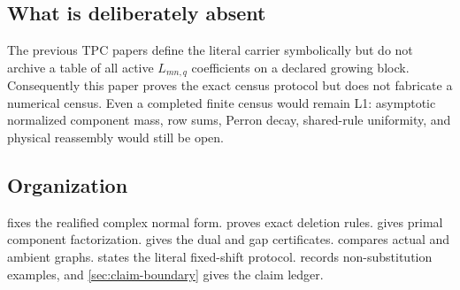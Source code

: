 \subsection{What is deliberately absent}

The previous TPC papers define the literal carrier symbolically but do
not archive a table of all active \(L_{mn,q}\) coefficients on a
declared growing block. Consequently this paper proves the exact census
protocol but does not fabricate a numerical census. Even a completed
finite census would remain L1: asymptotic normalized component mass,
row sums, Perron decay, shared-rule uniformity, and physical reassembly
would still be open.

\subsection{Organization}

 fixes the realified complex normal form.
 proves exact deletion rules.
 gives primal component factorization.
 gives the dual and gap certificates.
 compares actual and ambient graphs.
 states the literal fixed-shift protocol.
 records non-substitution examples, and
\cref{sec:claim-boundary} gives the claim ledger.
